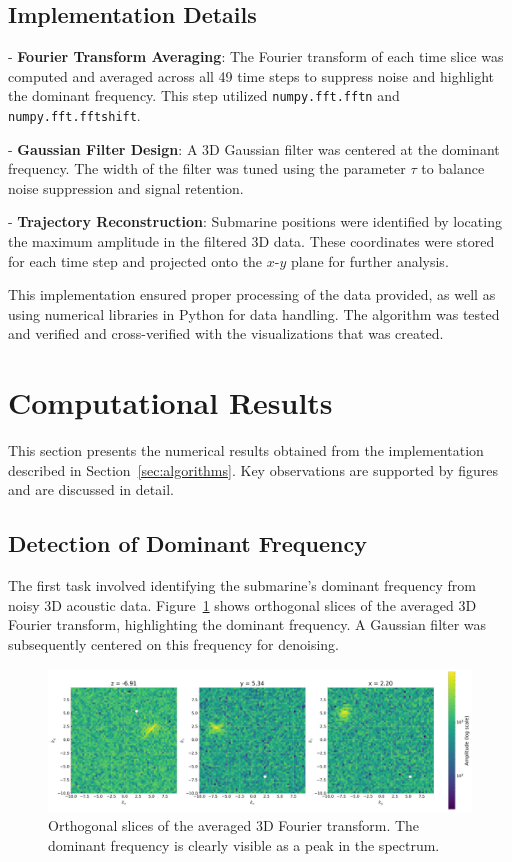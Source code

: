 \documentclass[11pt]{amsart}
\begin{document}
\subsection{Implementation Details}

- \textbf{Fourier Transform Averaging}: The Fourier transform of each time slice was computed and averaged across all 49 time steps to suppress noise and highlight the dominant frequency. This step utilized \texttt{numpy.fft.fftn} and \texttt{numpy.fft.fftshift}.
  
- \textbf{Gaussian Filter Design}: A 3D Gaussian filter was centered at the dominant frequency. The width of the filter was tuned using the parameter $\tau$ to balance noise suppression and signal retention.

- \textbf{Trajectory Reconstruction}: Submarine positions were identified by locating the maximum amplitude in the filtered 3D data. These coordinates were stored for each time step and projected onto the $x$-$y$ plane for further analysis.

This implementation ensured proper processing of the data provided, as well as using numerical libraries in Python for data handling. The algorithm was tested and verified and cross-verified with the visualizations that was created.


\section{Computational Results}\label{sec:results}

This section presents the numerical results obtained from the implementation described in Section~\ref{sec:algorithms}. Key observations are supported by figures and are discussed in detail.

\subsection{Detection of Dominant Frequency}

The first task involved identifying the submarine's dominant frequency from noisy 3D acoustic data. Figure~\ref{fig:fourier-slices} shows orthogonal slices of the averaged 3D Fourier transform, highlighting the dominant frequency. A Gaussian filter was subsequently centered on this frequency for denoising.

\begin{figure}[htp]
\centering
\includegraphics[width=\textwidth]{Dominant_Frequencies.png}
\caption{Orthogonal slices of the averaged 3D Fourier transform. The dominant frequency is clearly visible as a peak in the spectrum.}
\label{fig:fourier-slices}
\end{figure}
\end{document}
